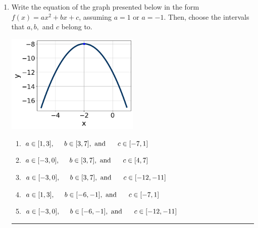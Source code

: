 \documentclass[14pt]{extbook}
\newcommand{\litem}[1]{\item#1\hspace*{-1cm}\rule{\textwidth}{0.4pt}}
\begin{document}
\begin{enumerate}
{\begin{enumerate}[label=\Alph*.]
\end{enumerate} }
\litem{
Write the equation of the graph presented below in the form $f(x)=ax^2+bx+c$, assuming  $a=1$ or $a=-1$. Then, choose the intervals that $a, b,$ and $c$ belong to.
\begin{center}
    \includegraphics[width=0.5\textwidth]{../Figures/quadraticGraphToEquationCopyC.png}
\end{center}
\begin{enumerate}[label=\Alph*.]
\item \( a \in [1, 3], \hspace*{5mm} b \in [3, 7], \text{ and } \hspace*{5mm} c \in [-7, 1] \)
\item \( a \in [-3, 0], \hspace*{5mm} b \in [3, 7], \text{ and } \hspace*{5mm} c \in [4, 7] \)
\item \( a \in [-3, 0], \hspace*{5mm} b \in [3, 7], \text{ and } \hspace*{5mm} c \in [-12, -11] \)
\item \( a \in [1, 3], \hspace*{5mm} b \in [-6, -1], \text{ and } \hspace*{5mm} c \in [-7, 1] \)
\item \( a \in [-3, 0], \hspace*{5mm} b \in [-6, -1], \text{ and } \hspace*{5mm} c \in [-12, -11] \)


\end{enumerate}}
\end{enumerate}
\end{document}
